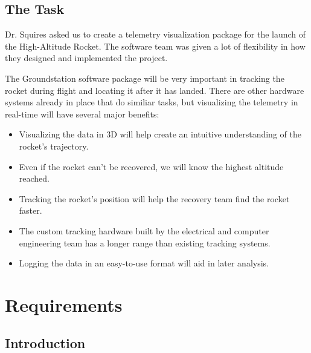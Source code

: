 \documentclass[10pt,draftclsnofoot,onecolumn]{IEEEtran}
\begin{document}
	
	\subsection{The Task}
	Dr. Squires asked us to create a telemetry visualization package for the launch
	of the High-Altitude Rocket.
	The software team was given a lot of flexibility in how they designed and implemented the project.
	
	The Groundstation software package will be very important in tracking the rocket during flight and locating
	it after it has landed.
	There are other hardware systems already in place that do similiar tasks, but visualizing
	the telemetry in real-time will have several major benefits:
	
	\begin{itemize}
		\item Visualizing the data in 3D will help create an intuitive understanding of the rocket's trajectory.
		\item Even if the rocket can't be recovered, we will know the highest altitude reached.
		\item Tracking the rocket's position will help the recovery team find the rocket faster.
		\item The custom tracking hardware built by the electrical and computer engineering team has a longer range than existing tracking systems.
		\item Logging the data in an easy-to-use format will aid in later analysis.
	\end{itemize}



	
	
	
	
	
	
	
	
	
	
	
	
	
	
	
	
	
	
	
	
	


\newpage
\section{Requirements}




	\subsection{Introduction}
\end{document}
